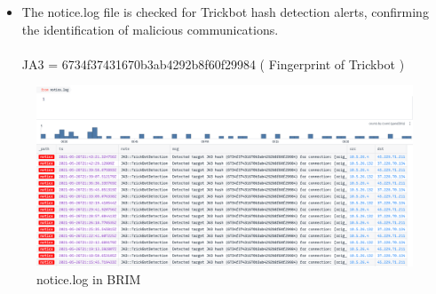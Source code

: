 \begin{itemize}
    \item  The notice.log file is checked for Trickbot hash detection alerts, confirming the identification of malicious communications.\\\\
    JA3 = 6734f37431670b3ab4292b8f60f29984 ( Fingerprint of Trickbot )
\end{itemize}
\begin{figure}[H]
    \centering
    \includegraphics[width=1\linewidth]{images//ja3image/32.PNG}
    \caption{notice.log in BRIM}
    \label{fig:enter-label}
\end{figure}
